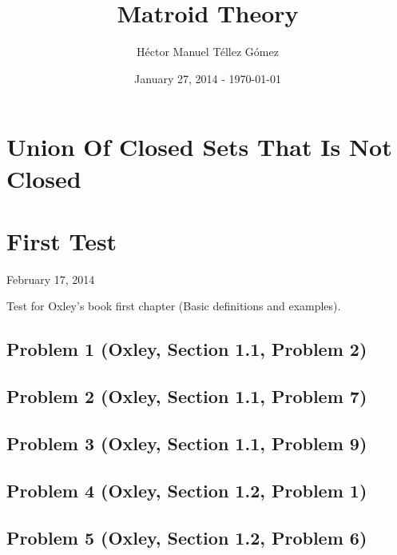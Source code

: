 \frontmatter
\title{Matroid Theory}
\author{Héctor Manuel Téllez Gómez}
\date{January 27, 2014 - \today}
\maketitle

\tableofcontents

\mainmatter


\chapter{Union Of Closed Sets That Is Not Closed}


\chapter{First Test}
    \begin{center} February 17, 2014 \end{center}
    Test for Oxley's book first chapter (Basic definitions and examples). 
    
    \section{Problem 1 (Oxley, Section 1.1, Problem 2)}
        
    
    \section{Problem 2 (Oxley, Section 1.1, Problem 7)}    
        

    \section{Problem 3 (Oxley, Section 1.1, Problem 9)}    
            
        
    \section{Problem 4 (Oxley, Section 1.2, Problem 1)}    
            
        
    \section{Problem 5 (Oxley, Section 1.2, Problem 6)}    
        
